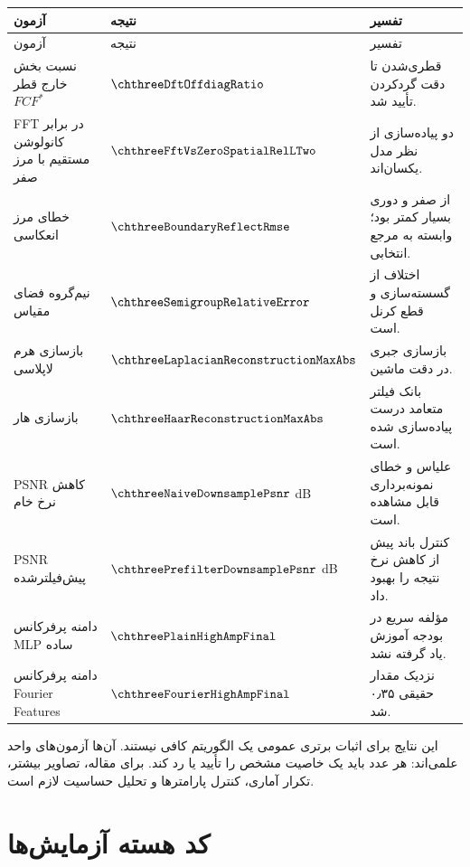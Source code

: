 \begin{longtable}{p{}p{}p{}}
\toprule
آزمون & نتیجه & تفسیر\\
\midrule
\endfirsthead
\toprule
آزمون & نتیجه & تفسیر\\
\midrule
\endhead
نسبت بخش خارج قطر \(FCF^*\) & \(\chthreeDftOffdiagRatio\) & قطری‌شدن تا دقت گردکردن تأیید شد.\\
FFT در برابر کانولوشن مستقیم با مرز صفر & \(\chthreeFftVsZeroSpatialRelLTwo\) & دو پیاده‌سازی از نظر مدل یکسان‌اند.\\
خطای مرز انعکاسی & \(\chthreeBoundaryReflectRmse\) & از صفر و دوری بسیار کمتر بود؛ وابسته به مرجع انتخابی.\\
نیم‌گروه فضای مقیاس & \(\chthreeSemigroupRelativeError\) & اختلاف از گسسته‌سازی و قطع کرنل است.\\
بازسازی هرم لاپلاسی & \(\chthreeLaplacianReconstructionMaxAbs\) & بازسازی جبری در دقت ماشین.\\
بازسازی هار & \(\chthreeHaarReconstructionMaxAbs\) & بانک فیلتر متعامد درست پیاده‌سازی شده است.\\
PSNR کاهش نرخ خام & \(\chthreeNaiveDownsamplePsnr\) dB & علیاس و خطای نمونه‌برداری قابل مشاهده است.\\
PSNR پیش‌فیلترشده & \(\chthreePrefilterDownsamplePsnr\) dB & کنترل باند پیش از کاهش نرخ نتیجه را بهبود داد.\\
دامنه پرفرکانس MLP ساده & \(\chthreePlainHighAmpFinal\) & مؤلفه سریع در بودجه آموزش یاد گرفته نشد.\\
دامنه پرفرکانس Fourier Features & \(\chthreeFourierHighAmpFinal\) & نزدیک مقدار حقیقی ۰٫۳۵ شد.\\
\bottomrule
\end{longtable}

\begin{warningbox}
این نتایج برای اثبات برتری عمومی یک الگوریتم کافی نیستند. آن‌ها آزمون‌های واحد علمی‌اند: هر عدد باید یک
خاصیت مشخص را تأیید یا رد کند. برای مقاله، تصاویر بیشتر، تکرار آماری، کنترل پارامترها و تحلیل حساسیت لازم است.
\end{warningbox}

\section{کد هسته آزمایش‌ها}

